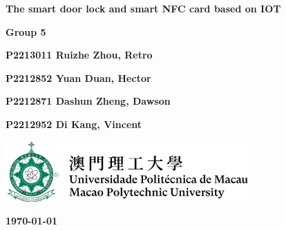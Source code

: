 \documentclass[11pt, a4paper]{article}
\begin{document}
\begin{titlepage}
    \begin{center}
        \vspace*{1.5cm}
            
        \Huge
        \textbf{The smart door lock and smart NFC card based on IOT}
            
        \vspace{3cm}    
        \huge
        
        
            
        \vspace{2cm}
        \Large
            
        \textbf{Group 5}                                         %

        \vspace{1.5cm}

        \textbf{P2213011 Ruizhe Zhou, Retro}                     %

        \textbf{P2212852 Yuan Duan, Hector}                      %

        \textbf{P2212871 Dashun Zheng, Dawson}                   %

        \textbf{P2212952 Di Kang, Vincent}                       %
        
        
        \vfill
        
        
            
        \vspace{1cm}
            
        \includegraphics[width=0.7\textwidth]{logo-mpu.png}
        \\
        
        \Large
        
        \textbf{\today}
            
    \end{center}
\end{titlepage}

\newpage
\end{document}
